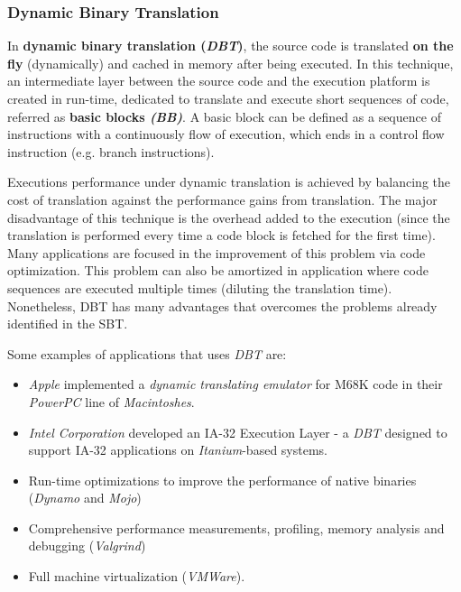 \subsubsection{Dynamic Binary Translation}
In \textbf{dynamic binary translation (\textit{DBT})}, the source code is translated \textbf{on the fly} (dynamically) and cached in memory after being executed. In this technique, an intermediate layer between the source code and the execution platform is created in run-time, dedicated to translate and execute short sequences of code, referred as \textbf{basic blocks \textit{(BB)}}. \cite{DBT1} A basic block can be defined as a sequence of instructions with  a continuously flow of execution, which ends in a control flow instruction (e.g. branch instructions).

Executions performance under dynamic translation is achieved by balancing the cost of translation against the performance gains from translation. \cite{BinaryTranslation2} The major disadvantage of this technique is the overhead added to the execution (since the translation is performed every time a code block is fetched for the first time). Many applications are focused in the improvement of this problem via code optimization. This problem can also be amortized in application where code sequences are executed multiple times (diluting the translation time). Nonetheless, DBT has many advantages that overcomes the problems already identified in the SBT.     

Some examples of applications that uses \textit{DBT} are:
\begin{itemize}
  \item \textit{Apple} implemented a \textit{dynamic translating emulator }for M68K code in their \textit{PowerPC} line of \textit{Macintoshes}.
  \item \textit{Intel Corporation} developed an IA-32 Execution Layer - a \textit{DBT} designed to support IA-32 applications on \textit{Itanium}-based systems.
  \item Run-time optimizations to improve the performance of native binaries (\textit{Dynamo} and \textit{Mojo})
  \item Comprehensive performance measurements, profiling, memory analysis and debugging (\textit{Valgrind})
  \item Full machine virtualization (\textit{VMWare}). \cite{BinaryTranslation2}
\end{itemize}